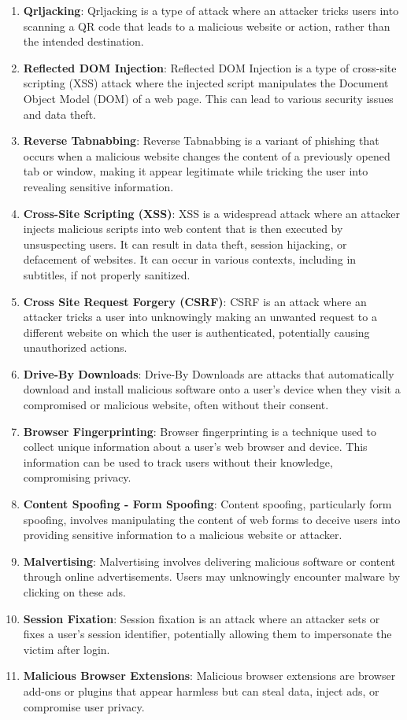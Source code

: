 \begin{enumerate}
  manipulation.
\item
  \textbf{Qrljacking}: Qrljacking is a type of attack where an attacker
  tricks users into scanning a QR code that leads to a malicious website
  or action, rather than the intended destination.
\item
  \textbf{Reflected DOM Injection}: Reflected DOM Injection is a type of
  cross-site scripting (XSS) attack where the injected script
  manipulates the Document Object Model (DOM) of a web page. This can
  lead to various security issues and data theft.
\item
  \textbf{Reverse Tabnabbing}: Reverse Tabnabbing is a variant of
  phishing that occurs when a malicious website changes the content of a
  previously opened tab or window, making it appear legitimate while
  tricking the user into revealing sensitive information.
\item
  \textbf{Cross-Site Scripting (XSS)}: XSS is a widespread attack where
  an attacker injects malicious scripts into web content that is then
  executed by unsuspecting users. It can result in data theft, session
  hijacking, or defacement of websites. It can occur in various
  contexts, including in subtitles, if not properly sanitized.
\item
  \textbf{Cross Site Request Forgery (CSRF)}: CSRF is an attack where an
  attacker tricks a user into unknowingly making an unwanted request to
  a different website on which the user is authenticated, potentially
  causing unauthorized actions.
\item
  \textbf{Drive-By Downloads}: Drive-By Downloads are attacks that
  automatically download and install malicious software onto a user's
  device when they visit a compromised or malicious website, often
  without their consent.
\item
  \textbf{Browser Fingerprinting}: Browser fingerprinting is a technique
  used to collect unique information about a user's web browser and
  device. This information can be used to track users without their
  knowledge, compromising privacy.
\item
  \textbf{Content Spoofing - Form Spoofing}: Content spoofing,
  particularly form spoofing, involves manipulating the content of web
  forms to deceive users into providing sensitive information to a
  malicious website or attacker.
\item
  \textbf{Malvertising}: Malvertising involves delivering malicious
  software or content through online advertisements. Users may
  unknowingly encounter malware by clicking on these ads.
\item
  \textbf{Session Fixation}: Session fixation is an attack where an
  attacker sets or fixes a user's session identifier, potentially
  allowing them to impersonate the victim after login.
\item
  \textbf{Malicious Browser Extensions}: Malicious browser extensions
  are browser add-ons or plugins that appear harmless but can steal
  data, inject ads, or compromise user privacy.
\end{enumerate}

%